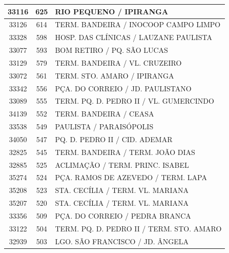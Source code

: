 \documentclass[
	12pt,				%
	oneside,			%
	a4paper,			%
	english,			%
	brazil				%
	]{abntex2ppgsi}
\begin{document}
\begin{apendicesenv}
\begin{longtable}{c|c|p{7cm}}
    33116 & 625   & RIO PEQUENO / IPIRANGA \\
\hline

    33126 & 614   & TERM. BANDEIRA / INOCOOP CAMPO LIMPO \\
\hline

    33328 & 598   & HOSP. DAS CLÍNICAS / LAUZANE PAULISTA \\
\hline

    33077 & 593   & BOM RETIRO / PQ. SÃO LUCAS \\
\hline

    33129 & 579   & TERM. BANDEIRA / VL. CRUZEIRO \\
\hline

    33072 & 561   & TERM. STO. AMARO / IPIRANGA \\
\hline

    33342 & 556   & PÇA. DO CORREIO / JD. PAULISTANO \\
\hline

    33089 & 555   & TERM. PQ. D. PEDRO II / VL. GUMERCINDO \\
\hline

    34139 & 552   & TERM. BANDEIRA / CEASA \\
\hline

    33538 & 549   & PAULISTA / PARAISÓPOLIS \\
\hline

    34050 & 547   & PQ. D. PEDRO II / CID. ADEMAR \\
\hline

    32825 & 545   & TERM. BANDEIRA / TERM. JOÃO DIAS \\
\hline

    32885 & 525   & ACLIMAÇÃO / TERM. PRINC. ISABEL \\
\hline

    35274 & 524   & PÇA. RAMOS DE AZEVEDO / TERM. LAPA \\
\hline

    35208 & 523   & STA. CECÍLIA / TERM. VL. MARIANA \\
\hline

    35207 & 520   & STA. CECÍLIA / TERM. VL. MARIANA \\
\hline

    33356 & 509   & PÇA. DO CORREIO / PEDRA BRANCA \\
\hline

    33122 & 504   & TERM. PQ. D. PEDRO II / TERM. STO. AMARO \\
\hline

    32939 & 503   & LGO. SÃO FRANCISCO / JD. ÂNGELA \\
\hline


\end{longtable}
\end{apendicesenv}
\end{document}
